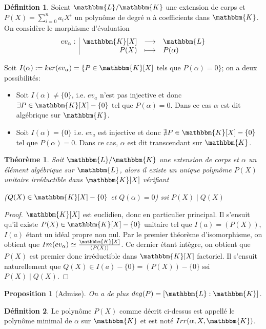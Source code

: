 \documentclass[12pt]{article}
\newcommand{\jL}{\mathbbm{L}}
\newcommand{\K}{\mathbbm{K}}
\newcommand{\fonction}[5]{
\begin{displaymath}
\begin{array}{l|rcl}
\displaystyle
#1 : & #2 & \longrightarrow & #3 \\
    & #4 & \longmapsto & #5
\end{array}
\end{displaymath}
}
\newtheorem{prop}{Proposition}
\newtheorem{thm}{Théorème}
\theoremstyle{definition}\newtheorem{defn}{Définition}
\theoremstyle{definition}\newtheorem{exm}{Exemple}
\theoremstyle{definition}\newtheorem{rem}{Remarque}
\theoremstyle{definition}\newtheorem{algo}{Algorithme}
\theoremstyle{remark}\newtheorem{exo}{Exercice}
\theoremstyle{remark}\newtheorem{nota}{Notation}
\begin{document}
\begin{defn}
Soient $\jL/\K$ une extension de corps et $P(X) = \sum_{i=0}^{n}a_iX^i$ un polynôme de degré $n$ à coefficients dans $\K$. On considère le morphisme d'évaluation \fonction{ev_\alpha}{\K[X]}{\jL}{P(X)}{P(\alpha)}
Soit $I(\alpha) :=  ker(ev_\alpha) = \{ P \in \K[X]$ tels que $P(\alpha) = 0\}$; on a deux possibilités:

\begin{itemize}
	\item Soit $I(\alpha) \ne \{ 0 \}$, i.e. $ev_a$ n'est pas injective et donc $\exists P \in \K[X] - \{0\}$ tel que $P(\alpha) = 0$. \newline
Dans ce cas $\alpha$ est dit algébrique sur $\K$.
	\item Soit $I(\alpha) = \{ 0 \}$ i.e. $ev_a$ est injective et donc $\nexists P \in \K[X] - \{0\}$ tel que $P(\alpha) = 0$. \newline
Dans ce cas, $\alpha$ est dit transcendant sur $\K$.
\end{itemize}
\end{defn}


\begin{thm}
Soit $\jL / \K$ une extension de corps et $\alpha$ un élément algébrique sur $\jL$, alors il existe un unique polynôme $P(X)$ unitaire irréductible dans $\K[X]$ vérifiant
\begin{center} ($Q(X) \in \K[X] - \{0\}$ et $Q(\alpha)=0$) ssi $P(X) \mid Q(X)$\end{center}
\end{thm}

\begin{proof}
$\K[X]$ est euclidien, donc en particulier principal. Il s'ensuit qu'il existe $P(X) \in \K[X] - \{0\}$ unitaire tel que $I(a) = (P(X))$, $I(a)$ étant un idéal propre non nul. Par le premier théorème d'isomorphisme, on obtient que $Im(ev_\alpha) \simeq \frac{\K[X]}{(P(X))}$. \newline
Ce dernier étant intègre, on obtient que $P(X)$ est premier donc irréductible dans $\K[X]$ factoriel. \newline
Il s'ensuit naturellement que $Q(X) \in I(a) - \{0\} = (P(X)) - \{0\}$ ssi $P(X) \mid Q(X)$.
\end{proof}

\begin{prop}[Admise]
On a de plus $deg(P) = [\jL : \K]$.
\end{prop}

\begin{defn}
Le polynôme $P(X)$ comme décrit ci-dessus est appellé le polynôme minimal de $\alpha$ sur $\K$ et est noté $Irr(\alpha,X,\K)$.
\end{defn}
\end{document}
